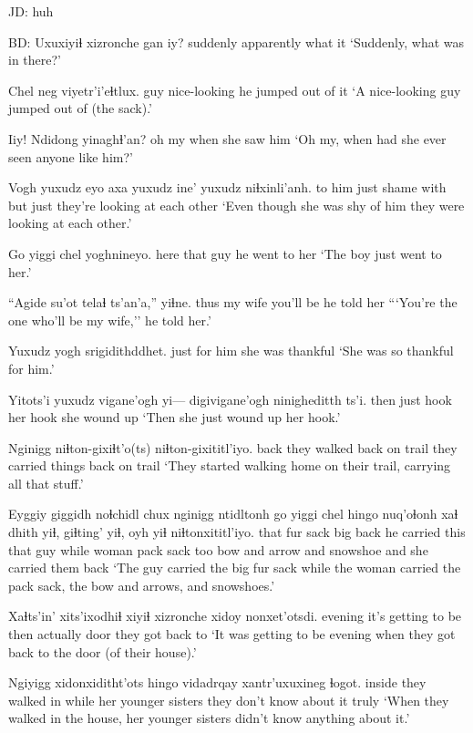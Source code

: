 \documentclass[12pt]{article}
\begin{document}
JD:  huh

BD:  
\gll Uxuxiyiɬ xizronche gan iy?
suddenly       apparently    what it 
\glt `Suddenly, what was in there?'
\glend

\gll Chel neg viyetr'i'eɬtlux.
guy  nice-looking  {he jumped out of it}
\glt `A nice-looking guy jumped out of (the sack).'
\glend

\gll Iiy! Ndidong yinaghɬ'an?
{{oh my}} when    {she saw him}
\glt `Oh my, when had she ever seen anyone like him?'
\glend

\gll Vogh yuxudz eyo axa yuxudz ine' yuxudz niɬxinli'anh.
{{to him}} just shame with {} but just {they're looking at each other}
\glt `Even though she was shy of him they were looking at each other.'
\glend

\gll Go yiggi chel yoghnineyo.
here that guy {he went to her}
\glt `The boy just went to her.'
\glend

\gll ``Agide su'ot telaɬ ts'an'a,'' yiɬne.
thus {my wife} {you'll be } {} {he told her}
\glt ```You're the one who'll be my wife,'' he told her.'
\glend

\gll Yuxudz yogh srigidithddhet.
just   {for him} {she was thankful}
\glt `She was so thankful for him.'
\glend

\gll Yitots'i yuxudz vigane'ogh yi--- digivigane'ogh ninigheditth ts'i.
then     just hook {} {her hook} {she wound up} 
\glt `Then she just wound up her hook.'
\glend

\gll Nginigg niɬton-gixiɬt'o(ts) niɬton-gixititl'iyo.
back    {they walked back on trail}           {they carried things back on trail}
\glt `They started walking home on their trail, carrying all that stuff.'
\glend

\gll Eyggiy {giggidh noɬchidl} chux nginigg ntidltonh go yiggi chel hingo nuq'oɬonh {xaɬ dhith} yiɬ, giɬting' yiɬ, oyh yiɬ niɬtonxititl'iyo.
that   {fur sack}         big  back    {he carried} this that guy while woman {pack sack} too {bow and arrow} and snowshoe and {she carried them back}
\glt `The guy carried the big fur sack while the woman carried the pack sack, the bow and arrows, and snowshoes.'
\glend

\gll Xaɬts'in' xits'ixodhiɬ xiyiɬ xizronche xidoy nonxet'otsdi.
evening {it's getting to be} then actually door {they got back to}
\glt `It was getting to be evening when they got back to the door (of their house).'
\glend

\gll Ngiyigg xidonxiditht'ots hingo vidadrqay xantr'uxuxineg ɬogot. 
inside  {they walked in} while {her younger sisters} {they don't know about it} truly
\glt `When they walked in the house, her younger sisters didn't know anything about it.'
\glend
\end{document}
